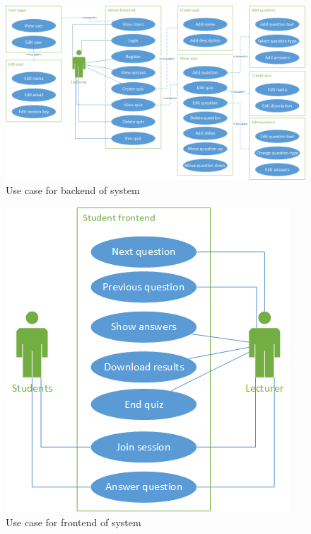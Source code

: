 \begin{figure}
	\caption{Use case for backend of system}
	\centerline{\includegraphics{Chapter3/final-backend-use-case}}
	\label{fig:final-backend-use-case}
\end{figure}

\begin{figure}
	\caption{Use case for frontend of system}
	\centerline{\includegraphics{Chapter3/final-frontend-use-case}}
	\label{fig:final-frontend-use-case}
\end{figure}

